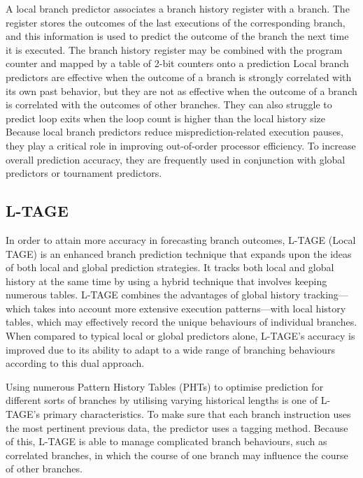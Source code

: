 \documentclass[10pt,journal,compsoc]{IEEEtran}
\begin{document}
A local branch predictor associates a branch history register with a branch. The register stores the outcomes of the last executions of the corresponding branch, and this information is used to predict the outcome of the branch the next time it is executed. The branch history register may be combined with the program counter and mapped by a table of 2-bit counters onto a prediction\cite{hoogerbruggeDynamicBranchPrediction2000a}
Local branch predictors are effective when the outcome of a branch is strongly correlated with its own past behavior, but they are not as effective when the outcome of a branch is correlated with the outcomes of other branches. They can also struggle to predict loop exits when the loop count is higher than the local history size\cite{mittalSurveyTechniquesDynamic2018}
Because local branch predictors reduce misprediction-related execution pauses, they play a critical role in improving out-of-order processor efficiency. To increase overall prediction accuracy, they are frequently used in conjunction with global predictors or tournament predictors.\cite{mittalSurveyTechniquesDynamic2018}
\subsection{L-TAGE}
\noindent In order to attain more accuracy in forecasting branch outcomes, L-TAGE (Local TAGE) is an enhanced branch prediction technique that expands upon the ideas of both local and global prediction strategies. It tracks both local and global history at the same time by using a hybrid technique that involves keeping numerous tables. L-TAGE combines the advantages of global history tracking—which takes into account more extensive execution patterns—with local history tables, which may effectively record the unique behaviours of individual branches. When compared to typical local or global predictors alone, L-TAGE's accuracy is improved due to its ability to adapt to a wide range of branching behaviours according to this dual approach.

Using numerous Pattern History Tables (PHTs) to optimise prediction for different sorts of branches by utilising varying historical lengths is one of L-TAGE's primary characteristics. To make sure that each branch instruction uses the most pertinent previous data, the predictor uses a tagging method. Because of this, L-TAGE is able to manage complicated branch behaviours, such as correlated branches, in which the course of one branch may influence the course of other branches.
\end{document}
